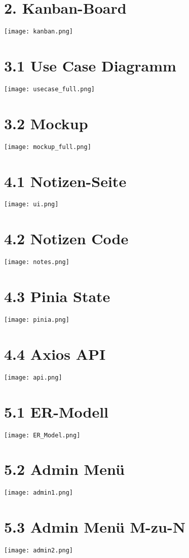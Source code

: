 \section*{2. Kanban-Board}
\label{kanban}
    \texttt{[image: kanban.png]}

\section*{3.1 Use Case Diagramm}
\label{usecase}
    \texttt{[image: usecase\_full.png]}

\section*{3.2 Mockup}
\label{mockup}
    \texttt{[image: mockup\_full.png]}

\section*{4.1 Notizen-Seite}
\label{ui}
    \texttt{[image: ui.png]}

\section*{4.2 Notizen Code}
\label{notes}
    \texttt{[image: notes.png]}

\section*{4.3 Pinia State}
\label{pinia}
    \texttt{[image: pinia.png]}

\section*{4.4 Axios API}
\label{api}
    \texttt{[image: api.png]}

\section*{5.1 ER-Modell}
\label{erm}
    \texttt{[image: ER\_Model.png]}

\section*{5.2 Admin Menü}
\label{admin}
    \texttt{[image: admin1.png]}

\section*{5.3 Admin Menü M-zu-N}
\label{admin2}
    \texttt{[image: admin2.png]}
